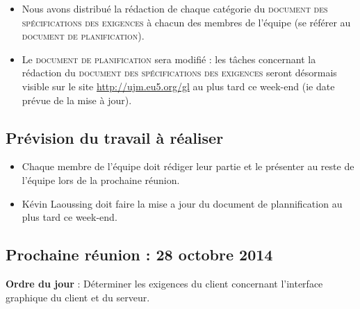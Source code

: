 \documentclass[12pt,a4paper]{article}
\begin{document}
\begin{itemize}[label = $\blacktriangleright$]
\item Nous avons distribué la rédaction de chaque catégorie du \textsc{document des spécifications des exigences} à chacun des membres de l'équipe (se référer au \textsc{document de planification}).

\item Le \textsc{document de planification} sera modifié : les tâches concernant la rédaction du \textsc{document des spécifications des exigences} seront désormais visible sur le site \url{http://ujm.eu5.org/gl} au plus tard ce week-end (ie date prévue de la mise à jour).\\
\end{itemize}

\subsection*{Prévision du travail à réaliser}

\begin{itemize}[label = $\blacktriangleright$]
\item Chaque membre de l'équipe doit rédiger leur partie et le présenter au reste de l'équipe lors de la prochaine réunion.

\item Kévin Laoussing doit faire la mise a jour du \textsf{document de plannification} au plus tard ce week-end.\\
\end{itemize}

\subsection*{Prochaine réunion : 28 octobre 2014}

\textbf{Ordre du jour} : Déterminer les exigences du client concernant l'interface graphique du client et du serveur.
\end{document}
